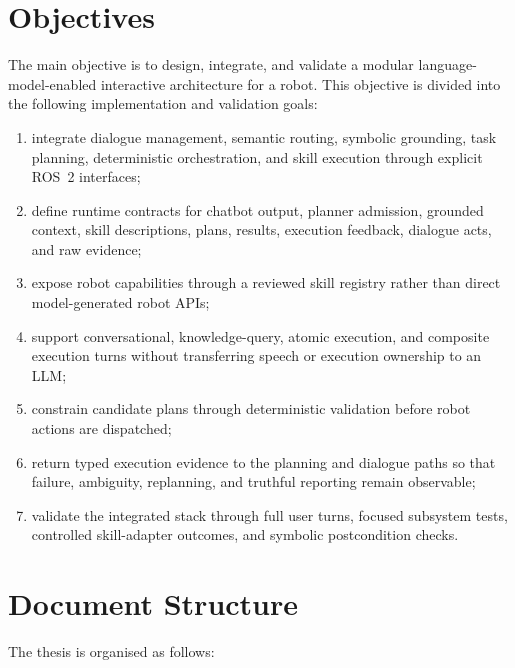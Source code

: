 \section{Objectives}

The main objective is to design, integrate, and validate a modular language-model-enabled interactive architecture for a robot. This objective is divided into the following implementation and validation goals:

\begin{enumerate}
  \item integrate dialogue management, semantic routing, symbolic grounding, task planning, deterministic orchestration, and skill execution through explicit ROS~2 interfaces;
  \item define runtime contracts for chatbot output, planner admission, grounded context, skill descriptions, plans, results, execution feedback, dialogue acts, and raw evidence;
  \item expose robot capabilities through a reviewed skill registry rather than direct model-generated robot APIs;
  \item support conversational, knowledge-query, atomic execution, and composite execution turns without transferring speech or execution ownership to an LLM;
  \item constrain candidate plans through deterministic validation before robot actions are dispatched;
  \item return typed execution evidence to the planning and dialogue paths so that failure, ambiguity, replanning, and truthful reporting remain observable;
  \item validate the integrated stack through full user turns, focused subsystem tests, controlled skill-adapter outcomes, and symbolic postcondition checks.
\end{enumerate}

\section{Document Structure}

The thesis is organised as follows:

